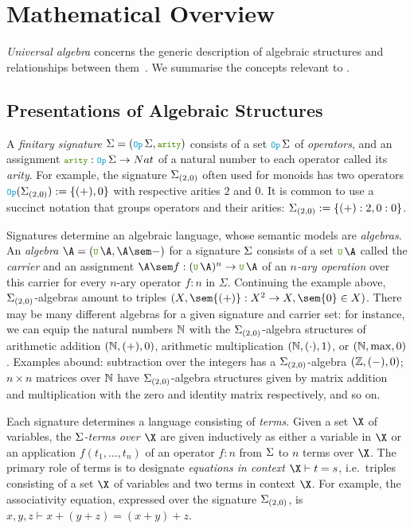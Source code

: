 \section{Mathematical Overview}
\emph{Universal algebra} concerns the generic description of algebraic
structures and relationships between them~\cite[Chp.~II]{burris-sankappanavar:universal-algebra}.
We summarise
the concepts relevant to \Frexlib{}.

\subsection{Presentations of Algebraic Structures}
A \emph{finitary signature} $\Sig = \pair{\Op\Sig}{\arity}$ consists
of a set $\Op\Sig$ of \emph{operators},
and an assignment $\arity : \Op\Sig \to \Nat$ of a natural
number to each operator called its \emph{arity}.
%
For example, the signature $\Sigma_{(2,0)}$ often used for monoids
has two operators $\Op(\Sig_{(2,0)}) \definedby \set{(+),0}$ with
respective arities $2$ and $0$.
%
It is common to use a succinct notation that groups operators
and their arities: $\Sigma_{(2,0)} := \left\{(+):2,0:0\right\}$.

Signatures determine an algebraic language, whose semantic models
are \emph{algebras}.
%
An \emph{algebra} $\A = \pair{\U\,\A}{\A\sem-}$
  for a signature $\Sigma$
  consists of
a set $\U\,\A$ called the \emph{carrier} and
an assignment $\A\sem f : (\U\,\A)^n \to \U\,\A$ of an \emph{$n$-ary operation} over this carrier for every $n$-ary operator $f : n$ in $\Sigma$.
%
Continuing the example above, $\Sigma_{(2,0)}$-algebras amount to
triples $\triple{X}{\sem{(+)} : X^2 \to X}{\sem{0} \in X}$.
%
There may be many different algebras for a given signature and carrier set:
for instance, we can equip the natural
numbers $\mathbb{N}$ with the $\Sigma_{(2,0)}$-algebra structures of
arithmetic addition $(\mathbb{N},(+),0)$,
arithmetic multiplication $(\mathbb{N},(\cdot),1)$,
or $(\mathbb{N},\max,0)$.
%
Examples abound:
subtraction over the integers has a $\Sigma_{(2,0)}$-algebra
$(\mathbb{Z},(-),0)$;
$n\times n$ matrices over $\mathbb{N}$ have
$\Sigma_{(2,0)}$-algebra structures given by matrix addition and
multiplication with the zero and identity matrix respectively, and so
on.
%

Each signature determines a language consisting of \emph{terms}.
Given a set $\X$ of variables, the
\emph{$\Sigma$-terms over $\X$} are given inductively as either a
variable in $\X$ or an application $f(t_1, \ldots, t_n)$ of an
operator $f : n$ from $\Sigma$ to $n$ terms over $\X$.
The primary role of terms is to designate \emph{equations in context}
$\X \vdash t = s$, i.e.~triples consisting of a set $\X$ of
variables and two terms in context $\X$. For example, the
associativity equation, expressed over the signature $\Sigma_{(2,0)}$,
is $x,y,z \vdash x + (y + z) = (x + y) + z$.

